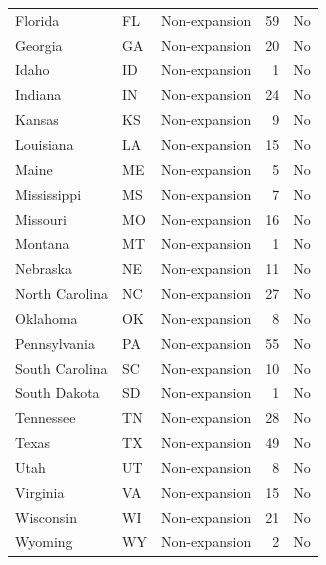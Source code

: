 \begin{table}[ht]
\begin{tabular}{lllrl}
  Florida & FL & Non-expansion &  59 & No \\ 
  Georgia & GA & Non-expansion &  20 & No \\ 
  Idaho & ID & Non-expansion &   1 & No \\ 
  Indiana & IN & Non-expansion &  24 & No \\ 
  Kansas & KS & Non-expansion &   9 & No \\ 
  Louisiana & LA & Non-expansion &  15 & No \\ 
  Maine & ME & Non-expansion &   5 & No \\ 
  Mississippi & MS & Non-expansion &   7 & No \\ 
  Missouri & MO & Non-expansion &  16 & No \\ 
  Montana & MT & Non-expansion &   1 & No \\ 
  Nebraska & NE & Non-expansion &  11 & No \\ 
  North Carolina & NC & Non-expansion &  27 & No \\ 
  Oklahoma & OK & Non-expansion &   8 & No \\ 
  Pennsylvania & PA & Non-expansion &  55 & No \\ 
  South Carolina & SC & Non-expansion &  10 & No \\ 
  South Dakota & SD & Non-expansion &   1 & No \\ 
  Tennessee & TN & Non-expansion &  28 & No \\ 
  Texas & TX & Non-expansion &  49 & No \\ 
  Utah & UT & Non-expansion &   8 & No \\ 
  Virginia & VA & Non-expansion &  15 & No \\ 
  Wisconsin & WI & Non-expansion &  21 & No \\ 
  Wyoming & WY & Non-expansion &   2 & No \\ 
   \hline
\end{tabular}
\end{table}

